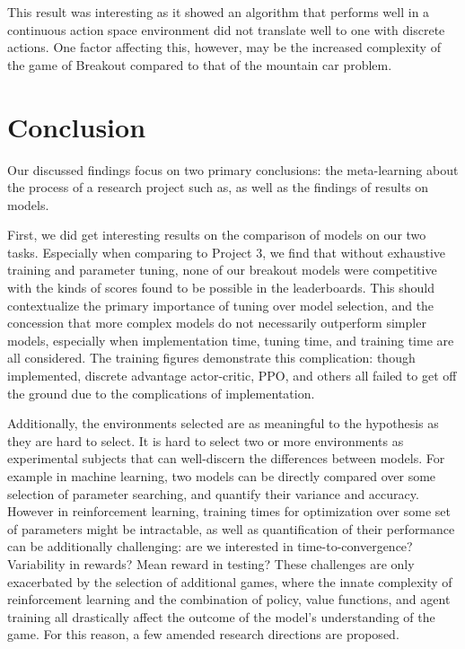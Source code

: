 \documentclass[conference]{IEEEtran}
\begin{document}
This result was interesting as it showed an algorithm that performs well in a continuous action space environment did not translate well to one with discrete actions.
One factor affecting this, however, may be the increased complexity of the game of Breakout compared to that of the mountain car problem.

\section{Conclusion} \label{conclusion}
Our discussed findings focus on two primary conclusions: the meta-learning about the process of a research project such as, as well as the findings of results on models.

First, we did get interesting results on the comparison of models on our two tasks. Especially when comparing to Project 3, we find that without exhaustive training and parameter tuning, none of our breakout models were competitive with the kinds of scores found to be possible in the leaderboards. This should contextualize the primary importance of tuning over model selection, and the concession that more complex models do not necessarily outperform simpler models, especially when implementation time, tuning time, and training time are all considered. The training figures demonstrate this complication: though implemented, discrete advantage actor-critic, PPO, and others all failed to get off the ground due to the complications of implementation.

Additionally, the environments selected are as meaningful to the hypothesis as they are hard to select. It is hard to select two or more environments as experimental subjects that can well-discern the differences between models. For example in machine learning, two models can be directly compared over some selection of parameter searching, and quantify their variance and accuracy. However in reinforcement learning, training times for optimization over some set of parameters might be intractable, as well as quantification of their performance can be additionally challenging: are we interested in time-to-convergence? Variability in rewards? Mean reward in testing? These challenges are only exacerbated by the selection of additional games, where the innate complexity of reinforcement learning and the combination of policy, value functions, and agent training all drastically affect the outcome of the model's understanding of the game. For this reason, a few amended research directions are proposed.
\end{document}
